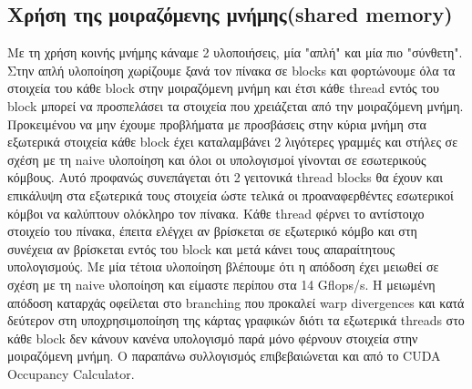 \documentclass[11pt,a4paper]{article}
\begin{document}
\subsection{Χρήση της μοιραζόμενης μνήμης(shared memory)}
Με τη χρήση κοινής μνήμης κάναμε 2 υλοποιήσεις, μία "απλή" και μία πιο "σύνθετη". Στην απλή υλοποίηση χωρίζουμε ξανά τον πίνακα 
σε blocks και φορτώνουμε όλα τα στοιχεία του κάθε block στην μοιραζόμενη μνήμη και έτσι κάθε thread εντός του block μπορεί να 
προσπελάσει τα στοιχεία που χρειάζεται από την μοιραζόμενη μνήμη. Προκειμένου να μην έχουμε προβλήματα με προσβάσεις στην κύρια 
μνήμη στα εξωτερικά στοιχεία κάθε block έχει καταλαμβάνει 2 λιγότερες γραμμές και στήλες σε σχέση με τη naive υλοποίηση  και όλοι οι υπολογισμοί γίνονται σε εσωτερικούς
κόμβους. Αυτό προφανώς συνεπάγεται ότι 2 γειτονικά thread blocks θα έχουν και επικάλυψη στα εξωτερικά τους στοιχεία ώστε τελικά οι προαναφερθέντες εσωτερικοί κόμβοι να καλύπτουν ολόκληρο τον πίνακα. Κάθε thread φέρνει το αντίστοιχο στοιχείο του πίνακα, έπειτα ελέγχει αν βρίσκεται σε εξωτερικό κόμβο και στη συνέχεια αν βρίσκεται εντός του block και μετά κάνει τους
απαραίτητους υπολογισμούς. Με μία τέτοια υλοποίηση βλέπουμε ότι η απόδοση έχει μειωθεί σε σχέση με τη naive υλοποίηση και είμαστε
περίπου στα 14 Gflops/s. Η μειωμένη απόδοση καταρχάς οφείλεται στο branching που προκαλεί warp divergences και κατά δεύτερον στη 
υποχρησιμοποίηση της κάρτας γραφικών διότι τα εξωτερικά threads στο κάθε block δεν κάνουν κανένα υπολογισμό παρά μόνο φέρνουν 
στοιχεία στην μοιραζόμενη μνήμη. O παραπάνω συλλογισμός επιβεβαιώνεται και από το CUDA Occupancy Calculator. \\ \\
\end{document}
